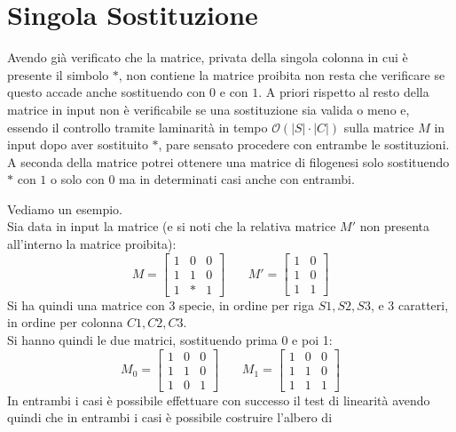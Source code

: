 \documentclass[a4paper,12pt, oneside]{book}
\begin{document}
\section{Singola Sostituzione}
Avendo già verificato che la matrice, privata della singola colonna in cui è
presente il simbolo $*$, non contiene la matrice proibita non resta che
verificare se questo accade anche sostituendo con $0$ e con $1$. A priori
rispetto al resto della matrice in input non è verificabile se una
sostituzione sia valida o meno e, essendo il controllo tramite laminarità in
tempo $\mathcal{O}(|S|\cdot |C|)$ sulla matrice $M$ in input dopo aver
sostituito $*$, pare sensato procedere con entrambe le sostituzioni. A seconda
della matrice potrei ottenere una matrice di filogenesi solo sostituendo $*$ con
$1$ o solo con $0$ ma in determinati casi anche con entrambi.
\begin{esempio}
  Vediamo un esempio.\\
  Sia data in input la matrice (e si noti che la relativa matrice $M'$ non
  presenta all'interno la matrice proibita):
  \[
    M=\left[
      \begin{matrix}
        1 & 0 & 0\\
        1 & 1 & 0\\
        1 & * & 1
      \end{matrix}
    \right]\,\,\,\,\,\,\,\,\,\,\, M'=\left[
      \begin{matrix}
        1 & 0\\
        1 & 0\\
        1 & 1
      \end{matrix}
    \right]
  \]
  Si ha quindi una matrice con 3 specie, in ordine per riga $S1,S2,S3$, e 3
  caratteri, in ordine per colonna $C1,C2,C3$.\\
  Si hanno quindi le due matrici, sostituendo prima 0 e poi 1:
  \[M_0=\left[
      \begin{matrix}
        1 & 0 & 0\\
        1 & 1 & 0\\
        1 & 0 & 1
      \end{matrix}
    \right]\,\,\,\,\,\,\,\,\,\,\,M_1=\left[
      \begin{matrix}
        1 & 0 & 0\\
        1 & 1 & 0\\
        1 & 1 & 1
      \end{matrix}
    \right]
  \]
  In entrambi i casi è possibile effettuare con successo il test di linearità
  avendo quindi che in entrambi i casi è possibile costruire l'albero di

\end{esempio}
\end{document}
